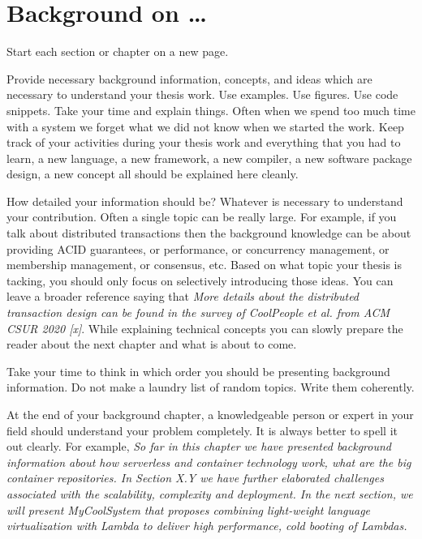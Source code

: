 \chapter{Background on \ldots}\label{s:background} 
Start each section or chapter on a new page. 

Provide necessary background information, concepts, and ideas which are necessary to understand your thesis work. Use examples. Use figures. Use code snippets. Take your time and explain things. Often when we spend too much time with a system we forget what we did not know when we started the work. Keep track of your activities during your thesis work and everything that you had to learn, a new language, a new framework, a new compiler, a new software package design, a new concept all should be explained here cleanly. 


How detailed your information should be? Whatever is necessary to understand your contribution. Often a single topic can be really large. For example, if you talk about distributed transactions then the background knowledge can be about providing ACID guarantees, or performance, or concurrency management, or membership management, or consensus, etc. Based on what topic your thesis is tacking, you should only focus on selectively introducing those ideas. You can leave a broader reference saying that \textit{More details about the distributed transaction design can be found in the survey of CoolPeople et al. from ACM CSUR 2020 [x]}. While explaining technical concepts you can slowly prepare the reader about the next chapter and what is about to come. 

Take your time to think in which order you should be presenting background information. Do not make a laundry list of random topics. Write them coherently. 

At the end of your background chapter, a knowledgeable person or expert in your field should understand your problem completely. It is always better to spell it out clearly. For example, \textit{So far in this chapter we have presented background information about how serverless and container technology work, what are the big container repositories. In Section X.Y we have further elaborated challenges associated with the scalability, complexity and deployment. In the next section, we will present MyCoolSystem that proposes combining light-weight language virtualization with Lambda to deliver high performance, cold booting of Lambdas.}
